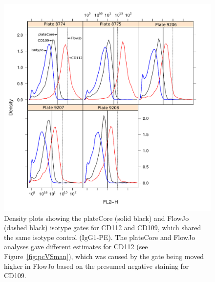 \documentclass[12pt]{article}
\begin{document}
\begin{figure}
\centering
\includegraphics{fjVSr3.pdf}
\caption{Density plots showing the plateCore (solid black) and FlowJo (dashed
black) isotype gates for CD112  and CD109, which shared the same isotype control
(IgG1-PE). The plateCore and FlowJo analyses gave different estimates for CD112
(see Figure~\ref{fig:pcVSman}), which was caused by the gate being moved
higher in FlowJo based on the presumed negative staining for CD109.}
\label{fig:pcVSman2}
\end{figure}
\end{document}
